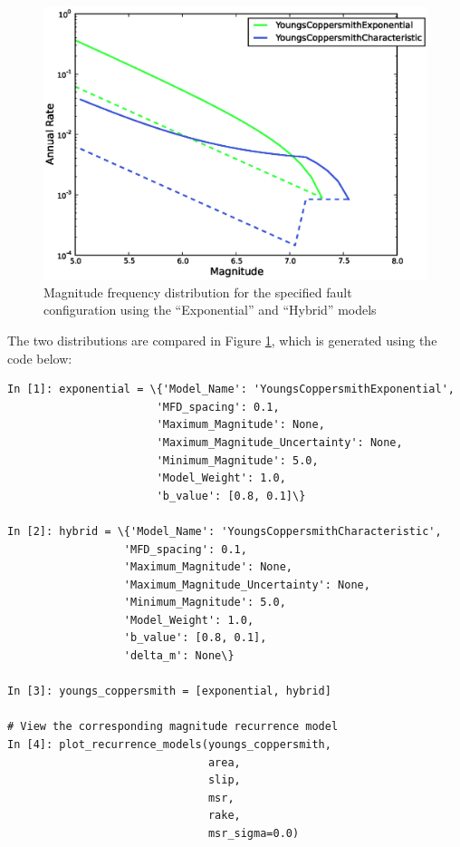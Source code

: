 \begin{figure}[htb]
  \centering
      \includegraphics[trim=5mm 5mm 5mm 5mm, clip, width=12cm]{./figures/youngs_coppersmith_mfds.eps}
  \caption{Magnitude frequency distribution for the specified fault configuration using the \cite{YoungsCoppersmith1985} ``Exponential'' and ``Hybrid'' models}
  \label{fig:youngs_coppersmith}
\end{figure}

The two \cite{YoungsCoppersmith1985} distributions are compared in Figure \ref{fig:youngs_coppersmith}, which is generated using the code below:
\begin{Verbatim}[frame=single, commandchars=\\\{\}, fontsize=\scriptsize]
In [1]: exponential = \{'Model_Name': 'YoungsCoppersmithExponential',
                       'MFD_spacing': 0.1,
                       'Maximum_Magnitude': None,
                       'Maximum_Magnitude_Uncertainty': None,
                       'Minimum_Magnitude': 5.0,
                       'Model_Weight': 1.0,
                       'b_value': [0.8, 0.1]\}

In [2]: hybrid = \{'Model_Name': 'YoungsCoppersmithCharacteristic',
                  'MFD_spacing': 0.1,
                  'Maximum_Magnitude': None,
                  'Maximum_Magnitude_Uncertainty': None,
                  'Minimum_Magnitude': 5.0,
                  'Model_Weight': 1.0,
                  'b_value': [0.8, 0.1],
                  'delta_m': None\}

In [3]: youngs_coppersmith = [exponential, hybrid]

# View the corresponding magnitude recurrence model
In [4]: plot_recurrence_models(youngs_coppersmith,
                               area,
                               slip,
                               msr,
                               rake,
                               msr_sigma=0.0)
\end{Verbatim}

